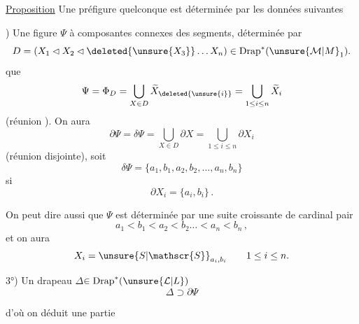 
\uline{Proposition} Une préfigure quelconque est déterminée par les données suivantes

) Une figure \textcircled{$\Psi$} à composantes connexes des  segments,  déterminée par
\[
D=(X_1\lhd X_2\lhd\deleted{\unsure{X_3}}\ldots X_n)\in\mathrm{Drap}^{*}(\unsure{\mathcal{M}|M}_1).
\]
 que
\[
\Psi=\Phi_D=\bigcup_{X\in D}\widetilde{X}_{\deleted{\unsure{i}}}=\bigcup_{1\leq i\leq n}\widetilde{X}_i
\]
(réunion ). On aura
\[
\partial\Psi=\delta\Psi=\bigcup_{X\in D}\partial X=\bigcup_{1\leq i\leq n}\partial X_i
\]
(réunion disjointe), soit
\[
\delta\Psi=\{a_1,b_1,a_2,b_2,\ldots,a_n,b_n\}
\]
si
\[
\partial X_i=\{a_i,b_i\}\,.
\]

On peut dire aussi que $\Psi$ est déterminée par une suite  croissante de cardinal pair
\[
a_1<b_1<a_2<b_2\ldots<a_n<b_n\,,
\]
et on aura
\[
X_i=\unsure{S|\mathscr{S}}_{a_i,b_i}\qquad 1\leq i\leq n.
\]

3°) Un drapeau \textcircled{$\Delta$}$\in\mathrm{Drap}^{*}(\unsure{\mathcal{L}|L})$
\[
\Delta\supset\partial\Psi
\]

d'où on déduit une partie

